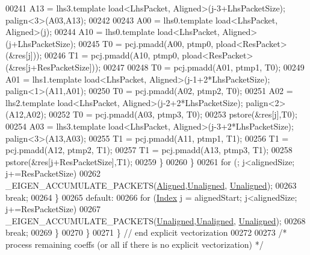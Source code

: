 \begin{DoxyCode}
{00241                 A13 = lhs3.template load<LhsPacket, Aligned>(j-3+LhsPacketSize);  palign<3>(A03,A13);
00242 
00243                 A00 = lhs0.template load<LhsPacket, Aligned>(j);
00244                 A10 = lhs0.template load<LhsPacket, Aligned>(j+LhsPacketSize);
00245                 T0  = pcj.pmadd(A00, ptmp0, pload<ResPacket>(&res[j]));
00246                 T1  = pcj.pmadd(A10, ptmp0, pload<ResPacket>(&res[j+ResPacketSize]));
00247 
00248                 T0  = pcj.pmadd(A01, ptmp1, T0);
00249                 A01 = lhs1.template load<LhsPacket, Aligned>(j-1+2*LhsPacketSize);  palign<1>(A11,A01);
00250                 T0  = pcj.pmadd(A02, ptmp2, T0);
00251                 A02 = lhs2.template load<LhsPacket, Aligned>(j-2+2*LhsPacketSize);  palign<2>(A12,A02);
00252                 T0  = pcj.pmadd(A03, ptmp3, T0);
00253                 pstore(&res[j],T0);
00254                 A03 = lhs3.template load<LhsPacket, Aligned>(j-3+2*LhsPacketSize);  palign<3>(A13,A03);
00255                 T1  = pcj.pmadd(A11, ptmp1, T1);
00256                 T1  = pcj.pmadd(A12, ptmp2, T1);
00257                 T1  = pcj.pmadd(A13, ptmp3, T1);
00258                 pstore(&res[j+ResPacketSize],T1);
00259               \}
00260             \}
00261             \textcolor{keywordflow}{for} (; j<alignedSize; j+=ResPacketSize)
00262               \_EIGEN\_ACCUMULATE\_PACKETS(\hyperlink{group__enums_gga45fe06e29902b7a2773de05ba27b47a1ad37d4c71425bb286e9b4103830538fbf}{Aligned},\hyperlink{group__enums_gga45fe06e29902b7a2773de05ba27b47a1ac935220b4c844108e183ebe30a4d5204}{Unaligned},
      \hyperlink{group__enums_gga45fe06e29902b7a2773de05ba27b47a1ac935220b4c844108e183ebe30a4d5204}{Unaligned});
00263             \textcolor{keywordflow}{break};
00264           \}
00265           \textcolor{keywordflow}{default}:
00266             \textcolor{keywordflow}{for} (\hyperlink{namespace_eigen_a62e77e0933482dafde8fe197d9a2cfde}{Index} j = alignedStart; j<alignedSize; j+=ResPacketSize)
00267               \_EIGEN\_ACCUMULATE\_PACKETS(\hyperlink{group__enums_gga45fe06e29902b7a2773de05ba27b47a1ac935220b4c844108e183ebe30a4d5204}{Unaligned},\hyperlink{group__enums_gga45fe06e29902b7a2773de05ba27b47a1ac935220b4c844108e183ebe30a4d5204}{Unaligned},
      \hyperlink{group__enums_gga45fe06e29902b7a2773de05ba27b47a1ac935220b4c844108e183ebe30a4d5204}{Unaligned});
00268             \textcolor{keywordflow}{break};
00269         \}
00270       \}
00271     \} \textcolor{comment}{// end explicit vectorization}
00272 
00273     \textcolor{comment}{/* process remaining coeffs (or all if there is no explicit vectorization) */}
}
\end{DoxyCode}
